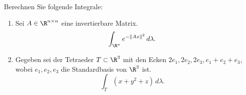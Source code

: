 \begin{prob}[Integrieren]
%
Berechnen Sie folgende Integrale:
\begin{enumerate}[label = (\alph*)]
	\item Sei $A \in \R^{n \times n}$ eine invertierbare Matrix.
	\[ \int_{\R^n} e^{ - \| A x \|^2 } \, d \lambda. \]
	\item Gegeben sei der Tetraeder $T \subset \R^3$ mit den Ecken $2 e_1 , 2 e_2 , 2 e_3, e_1 + e_2 + e_3$, wobei $e_1,e_2,e_3$ die Standardbasis von $\R^3$ ist.
	$$
	\int_T (x + y^2 + z) \, d \lambda.
	$$
\end{enumerate}

\vspace{2mm}
\end{prob}

